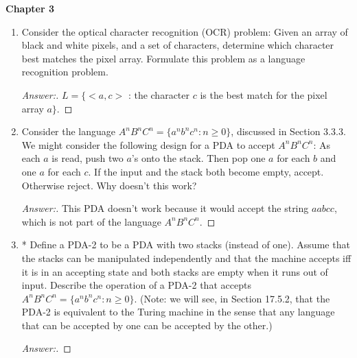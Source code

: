 \documentclass[10pt]{article}
\newcommand{\chtitle}[1]{\noindent \vspace{5mm}\textbf{Chapter #1}\vspace{3mm}}
\begin{document}
\pagebreak
\chtitle{3}
\begin{enumerate}
\addtocounter{enumi}{1}


\item
Consider the optical character recognition (OCR) problem: Given an array of black and white pixels, and a set of characters, determine which character best matches the pixel array. Formulate this problem as a language recognition problem.
\begin{proof}[Answer:]
$L = \{<a, c>$ : the character $c$ is the best match for the pixel array $a\}$.
\end{proof}


\item
Consider the language $A^nB^nC^n = \{a^nb^nc^n: n \geq 0\}$, discussed in Section 3.3.3.  We might consider the following design for a PDA to accept $A^nB^nC^n$:  As each $a$ is read, push two $a$'s onto the stack.  Then pop one $a$ for each $b$ and one $a$ for each $c$.  If the input and the stack both become empty, accept.  Otherwise reject.  Why doesn’t this 
work?
\begin{proof}[Answer:]
This PDA doesn't work because it would accept the string $aabcc$, which is not part of the language $A^nB^nC^n$.
\end{proof}


\item
* Define a PDA-2 to be a PDA with two stacks (instead of one).  Assume that the stacks can be manipulated independently and that the machine accepts iff it is in an accepting state and both stacks are empty when it runs out of input.  Describe the operation of a PDA-2 that accepts $A^nB^nC^n = \{a^nb^nc^n : n \geq 0\}$.  (Note: we will see, in Section 17.5.2, that the PDA-2 is equivalent to the Turing machine in the sense that any language that can be 
accepted by one can be accepted by the other.)
\begin{proof}[Answer:]
\end{proof}
\end{enumerate}
\end{document}
